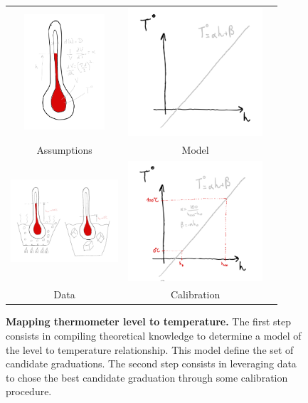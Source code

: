 \begin{bibunit}
\begin{figure}[h]
\begin{tabular}{ccc}
    \includegraphics[clip, width=3cm, width=3cm]{Introduction/pics/therm_theroy.png} &   \includegraphics[clip, width=5cm]{Introduction/pics/therm_model.png}  &   \\   Assumptions & Model&\\ 
     \includegraphics[clip, width=4cm, height=4cm, trim={2cm 1cm 2cm 2cm}]{Introduction/pics/therm_obs.png} &    \includegraphics[clip, width=5cm]{Introduction/pics/therm_calib.png}   &  \\    Data & Calibration&\\
\end{tabular}

    \caption{\textbf{Mapping thermometer level to temperature.} The first step consists in compiling theoretical knowledge to determine a model of the level to temperature relationship. This model define the set of candidate graduations. The second step consists in leveraging data to chose the best candidate graduation through some calibration procedure.}
    \label{fig:therm_mapping}
\end{figure}


\end{bibunit}
